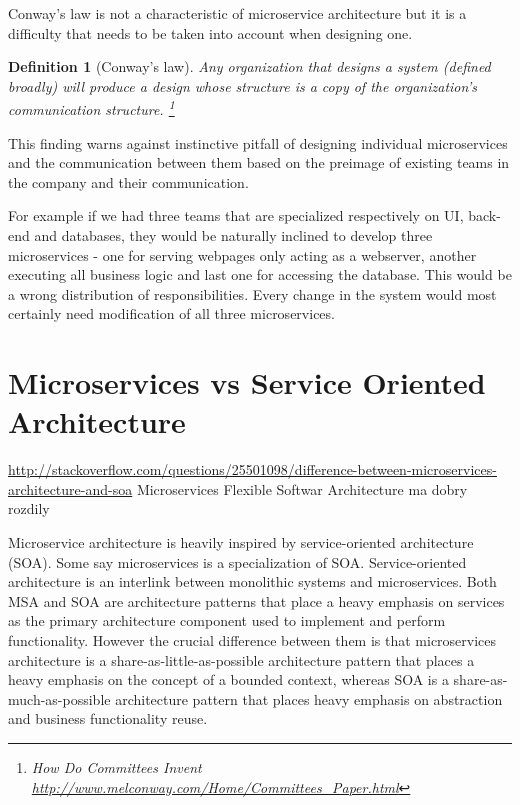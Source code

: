 \documentclass[12pt,oneside]{fithesis2}
\newtheorem{definition}{Definition}
\begin{document}
Conway's law is not a characteristic of microservice architecture but it is a difficulty that needs to be taken into account when designing one.

\begin{definition}[Conway's law]
Any organization that designs a system (defined broadly) will produce a design whose structure is a copy of the organization’s communication structure. \footnote{How Do Committees Invent \url{http://www.melconway.com/Home/Committees_Paper.html}}
\end{definition}

This finding warns against instinctive pitfall of designing individual microservices and the communication between them based on the preimage of existing teams in the company and their communication.

For example if we had three teams that are specialized respectively on UI, back-end and databases, they would be naturally inclined to develop three microservices - one for serving webpages only acting as a webserver, another executing all business logic and last one for accessing the database. This would be a wrong distribution of responsibilities. Every change in the system would most certainly need modification of all three microservices.

\section{Microservices vs Service Oriented Architecture}

\url{http://stackoverflow.com/questions/25501098/difference-between-microservices-architecture-and-soa}
Microservices Flexible Softwar Architecture ma dobry rozdily

Microservice architecture is heavily inspired by service-oriented architecture (SOA). Some say microservices is a specialization of SOA. Service-oriented architecture is an interlink between monolithic systems and microservices. Both MSA and SOA are architecture patterns that place a heavy emphasis on services as the primary architecture component used to implement and perform functionality. However the crucial difference between them is that microservices architecture is a share-as-little-as-possible architecture pattern that places a heavy emphasis on the concept of a bounded context, whereas SOA is a share-as-much-as-possible architecture pattern that places heavy emphasis on abstraction and business functionality reuse. \cite{mvsoa}
\end{document}
